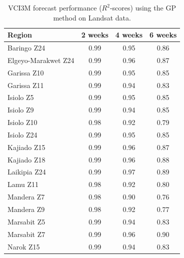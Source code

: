 \documentclass[review]{elsarticle}
\begin{document}

\begin{table}
	\footnotesize
	\caption{VCI3M forecast performance ($R^2$-scores) using the GP method on Landsat data.} \label{tab:VCI_LS}
	\centering
	\begin{tabular}{l|ccc} 
		\toprule
		\textbf{Region}  &  \textbf{2 weeks} &  \textbf{4 weeks}  & \textbf{6 weeks}  \\
		\midrule
		Baringo Z24 & 0.99 & 0.95 & 0.86 \\
		Elgeyo-Marakwet Z24 & 0.99 & 0.96 & 0.87 \\
		Garissa Z10 &  0.99 & 0.95 & 0.85 \\
		Garissa Z11 &  0.99 & 0.94 & 0.83 \\
		Isiolo Z5 &  0.99 & 0.95 & 0.85 \\
		Isiolo Z9 &  0.99 & 0.94 & 0.85 \\
		Isiolo Z10 &  0.98 & 0.92 & 0.79 \\
		Isiolo Z24 &  0.99 & 0.95 & 0.85 \\
		Kajiado Z15 & 0.99 & 0.96 & 0.87 \\
		Kajiado Z18 & 0.99 & 0.96 & 0.88 \\
		Laikipia Z24 & 0.99 & 0.97 & 0.89 \\
		Lamu Z11 &  0.98 & 0.92 & 0.80 \\
		Mandera Z7 &  0.98 & 0.90 & 0.76 \\
		Mandera Z9 &  0.98 & 0.92 & 0.77 \\
		Marsabit Z5 &  0.99 & 0.94 & 0.83 \\
		Marsabit Z7 & 0.99 & 0.96 & 0.90 \\
		Narok Z15 &  0.99 & 0.94 & 0.83 \\

\end{tabular}
\end{table}
\end{document}
